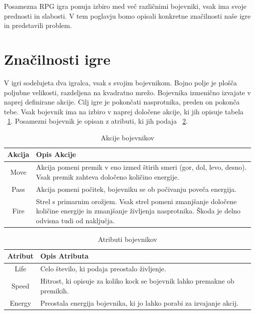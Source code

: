 \documentclass[12pt,a4paper,openany]{book}
\begin{document}
Posamezna RPG igra ponuja izbiro med več različnimi bojevniki, vsak ima svoje prednosti in slabosti. V tem poglavju bomo opisali konkretne značilnosti naše igre in predstavili problem.

\section{Značilnosti igre}
V igri sodelujeta dva igralca, vsak s svojim bojevnikom. Bojno polje je plošča poljubne velikosti, razdeljena na kvadratno mrežo. Bojevnika izmenično izvajate v naprej definirane akcije. Cilj igre je pokončati nasprotnika, preden on pokonča tebe. Vsak bojevnik ima na izbiro v naprej določene akcije, ki jih opisuje tabela ~\ref{table:akcijeBojevnikov}. Posamezni bojevnik je opisan z atributi, ki jih podaja ~\ref{table:atributiBojevnikov}.


\begin{table}[ht] \caption{Akcije bojevnikov}
\centering
\begin{tabular}{cp{10cm}}
\hline\hline
Akcija & Opis Akcije \\ [0.5ex]
\hline 
Move & Akcija pomeni premik v eno izmed štirih smeri (gor, dol, levo, desno). Vsak premik zahteva določeno količino energije.\\
Pass & Akcija pomeni počitek, bojevniku se ob počivanju poveča energija.\\
Fire & Strel s primarnim orožjem. Vsak strel pomeni zmanjšanje določene količine energije in zmanjšanje življenja nasprotnika. Škoda je delno odvisna tudi od naključja.\\ [1ex]
\hline %
\end{tabular}
\label{table:akcijeBojevnikov} %
\end{table}

\begin{table}[ht] \caption{Atributi bojevnikov}
\centering
\begin{tabular}{cp{10cm}}
\hline\hline
Atribut & Opis Atributa \\ [0.5ex]
\hline 
Life & Celo število, ki podaja preostalo življenje.\\
Speed & Hitrost, ki opisuje za koliko kock se bojevnik lahko premakne ob premikih.\\
Energy & Preostala energija bojevnika, ki jo lahko porabi za izvajanje akcij.\\ [1ex]
\hline %
\end{tabular}
\label{table:atributiBojevnikov} %
\end{table}
\end{document}

